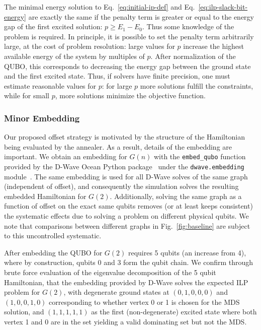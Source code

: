 \documentclass[prd,twocolumn,tightenlines,preprintnumbers,showpacs,superscriptaddress,notitlepage,nofootinbib,eqsecnum,floatfix,longbibliography,aps,10pt]{revtex4-1}
\begin{document}
The minimal energy solution to Eq.~\eqref{eq:initial-ip-def} and Eq.~\eqref{eq:ilp-slack-bit-energy} are exactly the same if the penalty term is greater or equal to the energy gap of the first excited solution: $p \geq E_1 - E_0$.
Thus some knowledge of the problem is required.
In principle, it is possible to set the penalty term arbitrarily large, at the cost of problem resolution: large values for $p$ increase the highest available energy of the system by multiples of $p$.
After normalization of the QUBO, this corresponds to decreasing the energy gap between the ground state and the first excited state.
Thus, if solvers have finite precision, one must estimate reasonable values for $p$: for large $p$ more solutions fulfill the constraints, while for small $p$, more solutions minimize the objective function.

\subsubsection{Minor Embedding}
\label{sec:methods:minor_embedding}
Our proposed offset strategy is motivated by the structure of the Hamiltonian being evaluated by the annealer.
As a result, details of the embedding are important. We obtain an embedding for $G(n)$ with the \texttt{embed\_qubo} function provided by the D-Wave Ocean Python package~\cite{dwave_oceans} under the \texttt{dwave.embedding} module~\cite{2008arXiv0804.4884C}.
The same embedding is used for all D-Wave solves of the same graph (independent of offset), and consequently the simulation solves the resulting embedded Hamiltonian for $G(2)$.
Additionally, solving the same graph as a function of offset on the exact same qubits removes (or at least keeps consistent) the systematic effects due to solving a problem on different physical qubits.
We note that comparisons between different graphs in Fig.~\ref{fig:baseline} are subject to this uncontrolled systematic.

After embedding the QUBO for $G(2)$ requires 5 qubits (an increase from 4), where by construction, qubits 0 and 3 form the qubit chain.
We confirm through brute force evaluation of the eigenvalue decomposition of the 5 qubit Hamiltonian, that the embedding provided by D-Wave solves the expected ILP problem for $G(2)$, with degenerate ground states at $(0, 1, 0, 0, 0)$ and $(1, 0, 0, 1, 0)$ corresponding to whether vertex 0 or 1 is chosen for the MDS solution, and $(1, 1, 1, 1, 1)$ as the first (non-degenerate) excited state where both vertex 1 and 0 are in the set yielding a valid dominating set but not the MDS.
\end{document}
